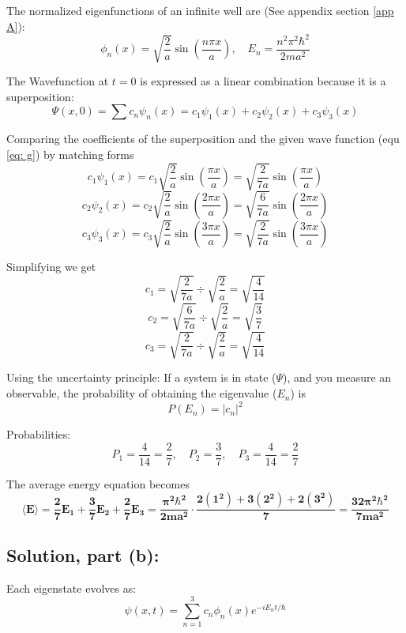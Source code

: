 \documentclass[12pt]{article}
\begin{document}
        The normalized eigenfunctions of an infinite well are (See appendix section \ref{app A}):
        \[
            \phi_n(x) = \sqrt{\frac{2}{a}} \sin\left( \frac{n \pi x}{a} \right),
            \quad
            E_n = \frac{n^2 \pi^2 \hbar^2}{2ma^2}
        \]
        
        The Wavefunction at $t=0$ is expressed as a linear combination because it is a superposition:
        \[
            \Psi(x,0) = \sum c_n\psi_n(x) = c_1 \psi_1(x) + c_2 \psi_2(x) + c_3 \psi_3(x)
        \]

        Comparing the coefficients of the superposition and the given wave function (equ \ref{eq: g}) by matching forms
        \[
            c_1 \psi_1(x) = c_1 \sqrt{\frac{2}{a}} \sin \left( \frac{\pi x}{a} \right) = \sqrt{\frac{2}{7a}} \sin \left( \frac{\pi x}{a} \right)
        \]
        \[
            c_2 \psi_2(x) = c_2 \sqrt{\frac{2}{a}} \sin\left( \frac{2\pi x}{a} \right) = \sqrt{\frac{6}{7a}} \sin\left( \frac{2\pi x}{a} \right)
        \]
        \[
            c_3 \psi_3(x) = c_3 \sqrt{\frac{2}{a}} \sin\left( \frac{3\pi x}{a} \right) = \sqrt{\frac{2}{7a}} \sin\left( \frac{3\pi x}{a} \right)
        \]

        Simplifying we get
        \[
            c_1 = \sqrt{\frac{2}{7a}} \div \sqrt{\frac{2}{a}} = \sqrt{\frac{4}{14}}
        \]
        \[
            c_2 = \sqrt{\frac{6}{7a}} \div \sqrt{\frac{2}{a}} = \sqrt{\frac{3}{7}}
        \]
        \[
            c_3 = \sqrt{\frac{2}{7a}} \div \sqrt{\frac{2}{a}} = \sqrt{\frac{4}{14}}
        \]

        Using the uncertainty principle:
        If a system is in state ($\Psi$), and you measure an observable, the probability of obtaining the eigenvalue ($E_n$) is
        \begin{equation} \label{eq: P}
            P(E_n) = |c_n|^2       
        \end{equation}
        
        Probabilities:
        \[
            P_1 = \frac{4}{14} = \frac{2}{7}, \quad
            P_2 = \frac{3}{7}, \quad
            P_3 = \frac{4}{14} = \frac{2}{7}
        \]
        
        The average energy equation becomes
        \[
            \boldsymbol{\boxed{\langle E \rangle = \frac{2}{7} E_1 + \frac{3}{7} E_2 + \frac{2}{7} E_3
            = \frac{\pi^2 \hbar^2}{2ma^2} \cdot \frac{2(1^2) + 3(2^2) + 2(3^2)}{7}
            = \frac{32 \pi^2 \hbar^2}{7ma^2}}}
        \]

    \subsection{Solution, part (b):}
        Each eigenstate evolves as:
        \[
            \psi(x,t) = \sum_{n=1}^{3} c_n \phi_n(x) e^{-i E_n t / \hbar}
        \]
        
\end{document}
